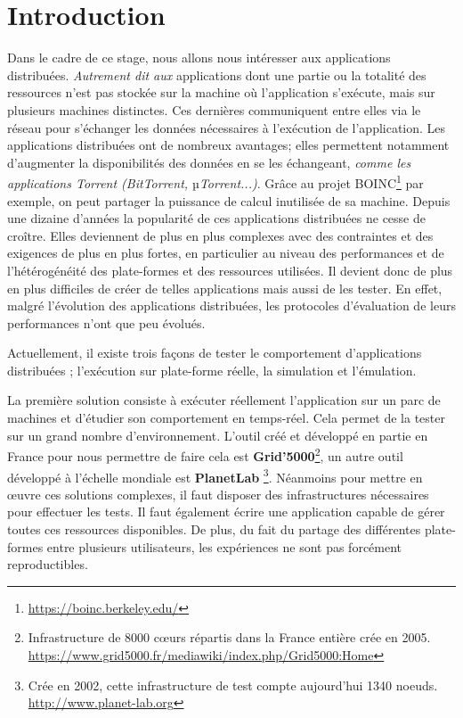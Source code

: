 \section{Introduction}



Dans le cadre de ce stage, nous allons nous intéresser aux applications distribuées. \textit{ Autrement dit aux} applications dont une partie ou la totalité des ressources  n'est pas stockée sur la machine où l'application s'exécute, mais sur plusieurs machines distinctes. Ces dernières communiquent entre elles via le réseau pour s'échanger les données nécessaires à l'exécution de l'application. Les applications distribuées ont de nombreux avantages; elles permettent notamment d'augmenter la disponibilités des données en se les échangeant,\textit{ comme les applications Torrent (BitTorrent, $µ$Torrent...)}. Grâce au projet BOINC\footnote{\url{https://boinc.berkeley.edu/}} par exemple, on peut partager la puissance de calcul inutilisée de sa machine. Depuis une dizaine d'années la popularité de ces applications distribuées ne cesse de croître. Elles deviennent de plus en plus complexes avec des contraintes et des exigences de plus en plus fortes, en particulier au niveau des performances et de l'hétérogénéité des plate-formes et des ressources utilisées. Il devient donc de plus en plus difficiles de créer de telles applications mais aussi de les tester. En effet, malgré l'évolution des applications distribuées, les protocoles d'évaluation de leurs performances n'ont que peu évolués.

Actuellement, il existe trois façons de tester le comportement d'applications distribuées \citep{gustedt2009experimental}; l'exécution sur plate-forme réelle, la simulation et l'émulation. 

La première solution consiste à exécuter réellement l'application sur un parc de machines et d'étudier son comportement en temps-réel. Cela permet de la tester sur un grand nombre d'environnement. L'outil créé et développé en partie en France pour nous permettre de faire cela est \textbf{Grid'5000}\footnote{Infrastructure de 8000 c\oe urs répartis dans la France entière crée en 2005. \\ \url{https://www.grid5000.fr/mediawiki/index.php/Grid5000:Home}}\citet{GRID5000}, un autre outil développé à l'échelle mondiale est \textbf{PlanetLab} \footnote{Crée en 2002, cette infrastructure de test compte aujourd'hui 1340 noeuds. \\ \url{http://www.planet-lab.org}}. Néanmoins pour mettre en \oe uvre ces solutions complexes, il faut disposer des infrastructures nécessaires pour effectuer les tests. Il faut également écrire une application capable de gérer toutes ces ressources disponibles. De plus, du fait du partage des différentes plate-formes entre plusieurs utilisateurs, les expériences ne sont pas forcément reproductibles. 

